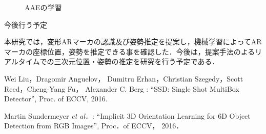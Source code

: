 \documentclass{jsarticle}
\begin{document}
\begin{figure}[ht]
\vspace{-5zh}
\setlength{\epsfxsize}{7.5cm}
\centerline{}
\vspace{5zh}
\caption{AAEの学習}
\label{BB}
\vspace{-1.0zh}
\end{figure}




今後行う予定

本研究では，変形ARマーカの認識及び姿勢推定を提案し，機械学習によってARマーカの座標位置，姿勢を推定できる事を確認した．今後は，提案手法のよるリアルタイムでの三次元位置・姿勢の推定を研究を行う予定である．

%
%
%

\begin{thebibliography}{1}
{\scriptsize 
{}
Wei Liu，Dragomir Anguelov， Dumitru Erhan，Christian Szegedy，Scott Reed，Cheng-Yang Fu， Alexander C. Berg : ``SSD: Single Shot MultiBox Detector'', Proc. of ECCV, 2016.}

{\scriptsize 
{}
Martin Sundermeyer {\em et al．}: ``Implicit 3D Orientation Learning for 6D Object Detection from RGB Images'', 
Proc．of ECCV， 2016．}

\end{thebibliography}
\end{document}
